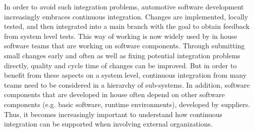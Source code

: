 %
%
%
%

In order to avoid such integration problems, automotive software development increasingly embraces continuous integration. 
Changes are implemented, locally tested, and then integrated into a main branch with the goal to obtain feedback from system level tests.
This way of working is now widely used by in house software teams that are working on software components.
Through submitting small changes early and often as well as fixing potential integration problems directly, quality and cycle time of changes can be improved.
But in order to benefit from these aspects on a system level, continuous integration from many teams need to be considered in a hierarchy of sub-systems.
In addition, software components that are developed in house often depend on other software components (e.g. basic software, runtime environments), developed by suppliers. 
Thus, it becomes increasingly important to understand how continuous integration can be supported when involving external organizations.

